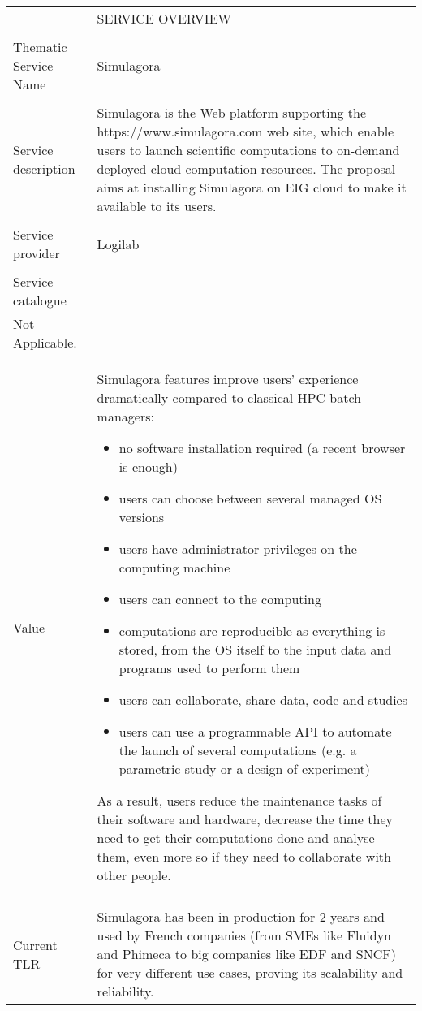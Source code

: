 \begin{longtable}{|p{7cm}|p{7cm}|}
\hline
 & SERVICE OVERVIEW\\
\\\hline
Thematic Service Name&Simulagora\\
\\\hline
Service description&
%
Simulagora is the Web platform supporting the
https://www.simulagora.com web site, which enable users to launch
scientific computations to on-demand deployed cloud computation
resources. The proposal aims at installing Simulagora on EIG cloud to
make it available to its users.
\\
\\\hline
Service provider&Logilab\\
\\\hline
Service catalogue&\\
%
Not Applicable.

\\\hline
Value&
%
Simulagora features improve users' experience dramatically compared to
classical HPC batch managers:
\begin {itemize}
\item no software installation required (a recent browser is enough)
\item users can choose between several managed OS versions
\item users have administrator privileges on the computing machine
\item users can connect to the computing
\item computations are reproducible as everything is stored, from the
  OS itself to the input data and programs used to perform them
\item users can collaborate, share data, code and studies
\item users can use a programmable API to automate the launch of
  several computations (e.g. a parametric study or a design of
  experiment)
\end {itemize}
%
As a result, users reduce the maintenance tasks of their software and
hardware, decrease the time they need to get their computations done
and analyse them, even more so if they need to collaborate with other
people.
\\
\\\hline
Current TLR&
%
Simulagora has been in production for 2 years and used by French
companies (from SMEs like Fluidyn and Phimeca to big companies like
EDF and SNCF) for very different use cases, proving its scalability
and reliability.


\end{longtable}
